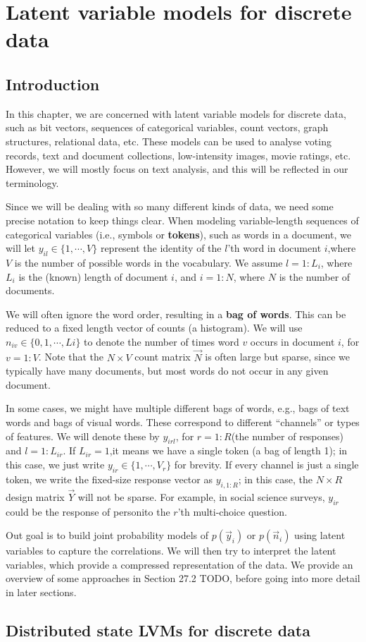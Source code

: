 \chapter{Latent variable models for discrete data}


\section{Introduction}
In this chapter, we are concerned with latent variable models for discrete data, such as bit vectors, sequences of categorical variables, count vectors, graph structures, relational data, etc. These models can be used to analyse voting records, text and document collections, low-intensity images, movie ratings, etc. However, we will mostly focus on text analysis, and this will be reflected in our terminology.

Since we will be dealing with so many different kinds of data, we need some precise notation to keep things clear. When modeling variable-length sequences of categorical variables (i.e., symbols or \textbf{tokens}), such as words in a document, we will let $y_{il} \in \{1,\cdots,V\}$ represent the identity of the $l$'th word in document $i$,where $V$ is the number of possible words in the vocabulary. We assume $l=1:L_i$, where $L_i$ is the (known) length of document $i$, and $i=1:N$, where $N$ is the number of documents.

We will often ignore the word order, resulting in a \textbf{bag of words}. This can be reduced to a fixed length vector of counts (a histogram). We will use $n_{iv} \in \{0,1,\cdots,Li\}$ to denote the number of times word $v$ occurs in document $i$, for $v=1:V$. Note that the $N \times V$ count matrix $\vec{N}$ is often large but sparse, since we typically have many documents, but most words do not occur in any given document.

In some cases, we might have multiple different bags of words, e.g., bags of text words and bags of visual words. These correspond to different “channels” or types of features. We will denote these by $y_{irl}$, for $r=1:R$(the number of responses) and $l=1:L_{ir}$. If $L_{ir} =1$,it means we have a single token (a bag of length 1); in this case, we just write $y_{ir} \in \{1,\cdots,V_r\}$ for brevity. If every channel is just a single token, we write the fixed-size response vector as $y_{i,1:R}$; in this case, the $N \times R$ design matrix $\vec{Y}$ will not be sparse. For example, in social science surveys, $y_{ir}$ could be the response of personito the $r$'th multi-choice question.

Out goal is to build joint probability models of $p(\vec{y}_i)$ or $p(\vec{n}_i)$ using latent variables to capture the correlations. We will then try to interpret the latent variables, which provide a compressed representation of the data. We provide an overview of some approaches in Section 27.2 TODO, before going into more detail in later sections.


\section{Distributed state LVMs for discrete data}

